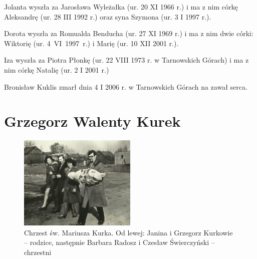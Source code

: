 

Jolanta wyszła za Jarosława Wyleżałka (ur. 20 XI 1966 r.) i ma z nim córkę Aleksandrę (ur. 28 III 1992 r.) oraz syna Szymona (ur. 3 I 1997 r.).


Dorota wyszła za Romualda Benducha (ur. 27 XI 1969 r.) i ma z nim dwie córki: Wiktorię (ur. 4~VI~1997~r.) i Marię (ur. 10 XII 2001 r.).


Iza wyszła za Piotra Płonkę (ur. 22 VIII 1973 r. w Tarnowskich Górach) i ma z nim córkę Natalię (ur. 2 I 2001 r.)

Bronisław Kuklis zmarł dnia 4 I 2006 r. w Tarnowskich Górach na zawał serca.




\section{Grzegorz Walenty Kurek}

\begin{figure}[!hb]
\begin{center}
\includegraphics[width=0.5\textwidth]{zdjecia/chrzest_mariusza_kurka.jpg}
\caption[Chrzest św. Mariusza Kurka]{Chrzest św. Mariusza Kurka. Od lewej: Janina i Grzegorz Kurkowie -- rodzice, następnie Barbara Radosz i Czesław Świerczyński -- chrzestni}
\label{rys:chrzest_mariusza_kurka}
\end{center}
\end{figure}

